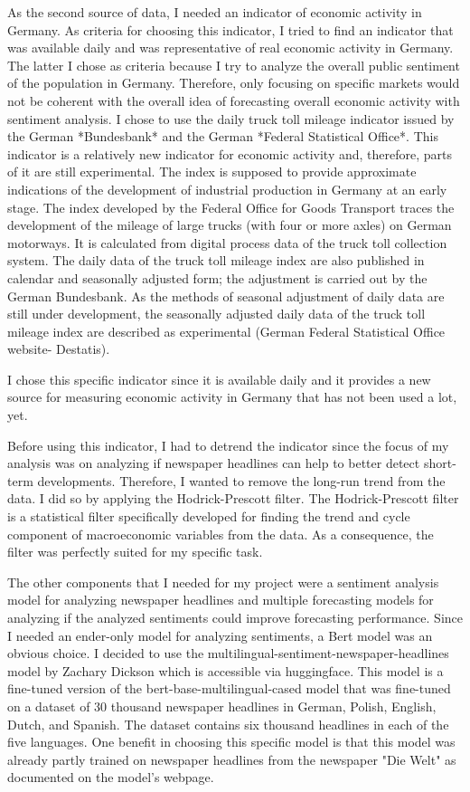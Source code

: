\documentclass[11pt, a4paper, leqno]{article}
\begin{document}
As the second source of data, I needed an indicator of economic activity in Germany. As criteria for choosing this indicator, I tried to find an indicator that was available daily and was representative of real economic activity in Germany. The latter I chose as criteria because I try to analyze the overall public sentiment of the population in Germany. Therefore, only focusing on specific markets would not be coherent with the overall idea of forecasting overall economic activity with sentiment analysis.
I chose to use the daily truck toll mileage indicator issued by the German *Bundesbank* and the German *Federal Statistical Office*. This indicator is a relatively new indicator for economic activity and, therefore, parts of it are still experimental. The index is supposed to provide approximate indications of the development of industrial production in Germany at an early stage. The index developed by the Federal Office for Goods Transport traces the development of the mileage of large trucks (with four or more axles) on German motorways. It is calculated from digital process data of the truck toll collection system. The daily data of the truck toll mileage index are also published in calendar and seasonally adjusted form; the adjustment is carried out by the German Bundesbank. As the methods of seasonal adjustment of daily data are still under development, the seasonally adjusted daily data of the truck toll mileage index are described as experimental (German Federal Statistical Office website- Destatis).

I chose this specific indicator since it is available daily and it provides a new source for measuring economic activity in Germany that has not been used a lot, yet.

Before using this indicator, I had to detrend the indicator since the focus of my analysis was on analyzing if newspaper headlines can help to better detect short-term developments. Therefore, I wanted to remove the long-run trend from the data. I did so by applying the Hodrick-Prescott filter. The Hodrick-Prescott filter is a statistical filter specifically developed for finding the trend and cycle component of macroeconomic variables from the data. As a consequence, the filter was perfectly suited for my specific task. 

The other components that I needed for my project were a sentiment analysis model for analyzing newspaper headlines and multiple forecasting models for analyzing if the analyzed sentiments could improve forecasting performance. Since I needed an ender-only model for analyzing sentiments, a Bert model was an obvious choice. I decided to use the multilingual-sentiment-newspaper-headlines model by Zachary Dickson which is accessible via huggingface. This model is a fine-tuned version of the bert-base-multilingual-cased model that was fine-tuned on a dataset of 30 thousand newspaper headlines in German, Polish, English, Dutch, and Spanish. The dataset contains six thousand headlines in each of the five languages.
One benefit in choosing this specific model is that this model was already partly trained on newspaper headlines from the newspaper "Die Welt" as documented on the model's webpage.
\end{document}
